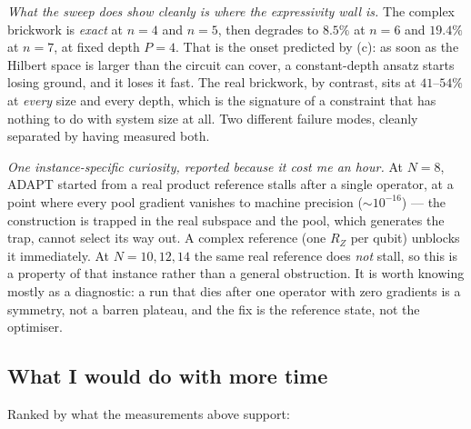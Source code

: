 \documentclass[10pt,a4paper]{article}
\begin{document}
\emph{What the sweep does show cleanly is where the expressivity wall is.} The
complex brickwork is \emph{exact} at $n=4$ and $n=5$, then degrades to $8.5\%$
at $n=6$ and $19.4\%$ at $n=7$, at fixed depth $P=4$. That is the onset
predicted by (c): as soon as the Hilbert space is larger than the circuit can
cover, a constant-depth ansatz starts losing ground, and it loses it fast. The
real brickwork, by contrast, sits at $41$--$54\%$ at \emph{every} size and
every depth, which is the signature of a constraint that has nothing to do with
system size at all. Two different failure modes, cleanly separated by having
measured both.

\emph{One instance-specific curiosity, reported because it cost me an hour.} At
$N=8$, ADAPT started from a real product reference stalls after a single
operator, at a point where every pool gradient vanishes to machine precision
($\sim10^{-16}$) --- the construction is trapped in the real subspace and the
pool, which generates the trap, cannot select its way out. A complex reference
(one $R_Z$ per qubit) unblocks it immediately. At $N=10,12,14$ the same real
reference does \emph{not} stall, so this is a property of that instance rather
than a general obstruction. It is worth knowing mostly as a diagnostic: a run
that dies after one operator with zero gradients is a symmetry, not a barren
plateau, and the fix is the reference state, not the optimiser.

\subsection{What I would do with more time}
\label{sec:more}

Ranked by what the measurements above support:
\end{document}
